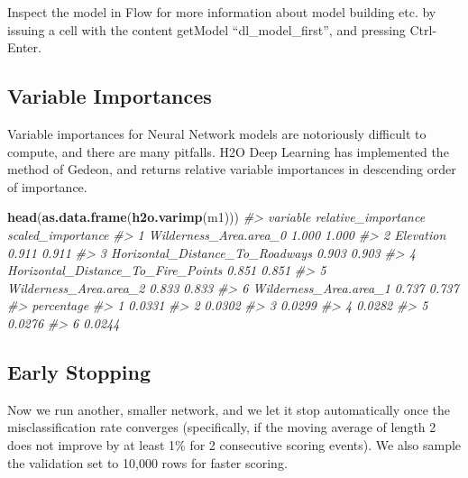 \documentclass[]{book}
\newenvironment{Shaded}{\begin{snugshade}}{\end{snugshade}}
\newcommand{\CommentTok}[1]{\textcolor[rgb]{0.56,0.35,0.01}{\textit{#1}}}
\newcommand{\KeywordTok}[1]{\textcolor[rgb]{0.13,0.29,0.53}{\textbf{#1}}}
\newcommand{\NormalTok}[1]{#1}
\begin{document}
Inspect the model in Flow for more information about model building etc. by issuing a cell with the content getModel ``dl\_model\_first'', and pressing Ctrl-Enter.

\hypertarget{variable-importances}{%
\subsection{Variable Importances}\label{variable-importances}}

Variable importances for Neural Network models are notoriously difficult to compute, and there are many pitfalls. H2O Deep Learning has implemented the method of Gedeon, and returns relative variable importances in descending order of importance.

\begin{Shaded}
\begin{Highlighting}[]
\KeywordTok{head}\NormalTok{(}\KeywordTok{as.data.frame}\NormalTok{(}\KeywordTok{h2o.varimp}\NormalTok{(m1)))}
\CommentTok{#>                             variable relative_importance scaled_importance}
\CommentTok{#> 1             Wilderness_Area.area_0               1.000             1.000}
\CommentTok{#> 2                          Elevation               0.911             0.911}
\CommentTok{#> 3    Horizontal_Distance_To_Roadways               0.903             0.903}
\CommentTok{#> 4 Horizontal_Distance_To_Fire_Points               0.851             0.851}
\CommentTok{#> 5             Wilderness_Area.area_2               0.833             0.833}
\CommentTok{#> 6             Wilderness_Area.area_1               0.737             0.737}
\CommentTok{#>   percentage}
\CommentTok{#> 1     0.0331}
\CommentTok{#> 2     0.0302}
\CommentTok{#> 3     0.0299}
\CommentTok{#> 4     0.0282}
\CommentTok{#> 5     0.0276}
\CommentTok{#> 6     0.0244}
\end{Highlighting}
\end{Shaded}

\hypertarget{early-stopping}{%
\subsection{Early Stopping}\label{early-stopping}}

Now we run another, smaller network, and we let it stop automatically once the misclassification rate converges (specifically, if the moving average of length 2 does not improve by at least 1\% for 2 consecutive scoring events). We also sample the validation set to 10,000 rows for faster scoring.
\end{document}
